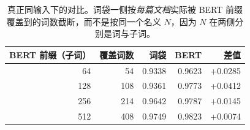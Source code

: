 \begin{table}[t]
\centering
\scriptsize
\caption{真正同输入下的对比。词袋一侧按\emph{每篇文档}实际被 BERT 前缀覆盖到的词数截断，而不是按同一个名义 $N$，因为 $N$ 在两侧分别是词与子词。}
\label{tab:matched}
\begin{tabular}{rrrrr}
\toprule
BERT 前缀（子词） & 覆盖词数 & 词袋 & BERT & 差值 \\
\midrule
64 & 54 & 0.9338 & 0.9623 & +0.0285 \\
128 & 108 & 0.9361 & 0.9773 & +0.0412 \\
256 & 214 & 0.9642 & 0.9787 & +0.0145 \\
512 & 408 & 0.9749 & 0.9823 & +0.0074 \\
\bottomrule
\end{tabular}
\end{table}
